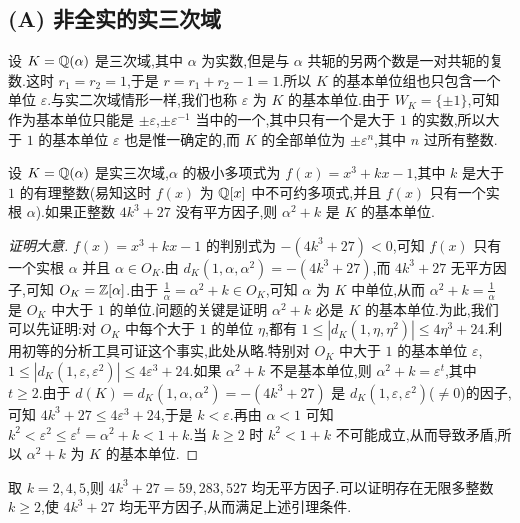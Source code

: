 \subsection*{(A) 非全实的实三次域}

设 $K=\mathbb{Q}(\alpha)$ 是三次域,其中 $\alpha$ 为实数,但是与 $\alpha$ 共轭的另两个数是一对共轭的复数.这时 $r_1=r_2=1$,于是 $r=r_1+r_2-1=1$.所以 $K$ 的基本单位组也只包含一个单位 $\varepsilon$.与实二次域情形一样,我们也称 $\varepsilon$ 为 $K$ 的基本单位.由于 $W_K=\{\pm1\}$,可知作为基本单位只能是 $\pm\varepsilon$,$\pm\varepsilon^{-1}$ 当中的一个,其中只有一个是大于 $1$ 的实数,所以大于 $1$ 的基本单位 $\varepsilon$ 也是惟一确定的,而 $K$ 的全部单位为 $\pm\varepsilon^n$,其中 $n$ 过所有整数.

\begin{lemma}\label{lem:ch3-12}
设 $K=\mathbb{Q}(\alpha)$ 是实三次域,$\alpha$ 的极小多项式为 $f(x)=x^3+kx-1$,其中 $k$ 是大于 $1$ 的有理整数(易知这时 $f(x)$ 为 $\mathbb{Q}[x]$ 中不可约多项式,并且 $f(x)$ 只有一个实根 $\alpha$).如果正整数 $4k^3+27$ 没有平方因子,则 $\alpha^2+k$ 是 $K$ 的基本单位.
\end{lemma}

\begin{proof}[证明大意]
$f(x)=x^3+kx-1$ 的判别式为 $-(4k^3+27)<0$,可知 $f(x)$ 只有一个实根 $\alpha$ 并且 $\alpha\in O_K$.由 $d_K(1,\alpha,\alpha^2)=-(4k^3+27)$,而 $4k^3+27$ 无平方因子,可知 $O_K=\mathbb{Z}[\alpha]$.由于 $\frac{1}{\alpha}=\alpha^2+k\in O_K$,可知 $\alpha$ 为 $K$ 中单位,从而 $\alpha^2+k=\frac{1}{\alpha}$ 是 $O_K$ 中大于 $1$ 的单位.问题的关键是证明 $\alpha^2+k$ 必是 $K$ 的基本单位.为此,我们可以先证明:对 $O_K$ 中每个大于 $1$ 的单位 $\eta$,都有 $1\leqslant|d_K(1,\eta,\eta^2)|\leqslant 4\eta^3+24$.利用初等的分析工具可证这个事实,此处从略.特别对 $O_K$ 中大于 $1$ 的基本单位 $\varepsilon$,$1\leqslant|d_K(1,\varepsilon,\varepsilon^2)|\leqslant 4\varepsilon^3+24$.如果 $\alpha^2+k$ 不是基本单位,则 $\alpha^2+k=\varepsilon^t$,其中 $t\geqslant 2$.由于 $d(K)=d_K(1,\alpha,\alpha^2)=-(4k^3+27)$ 是 $d_K(1,\varepsilon,\varepsilon^2)$($\neq 0$)的因子,可知 $4k^3+27\leqslant 4\varepsilon^3+24$,于是 $k<\varepsilon$.再由 $\alpha<1$ 可知 $k^2<\varepsilon^2\leqslant\varepsilon^t=\alpha^2+k<1+k$.当 $k\geqslant 2$ 时 $k^2<1+k$ 不可能成立,从而导致矛盾,所以 $\alpha^2+k$ 为 $K$ 的基本单位.
\end{proof}

\begin{remark}
取 $k=2,4,5$,则 $4k^3+27=59,283,527$ 均无平方因子.可以证明存在无限多整数 $k\geqslant 2$,使 $4k^3+27$ 均无平方因子,从而满足上述引理条件.
\end{remark}

